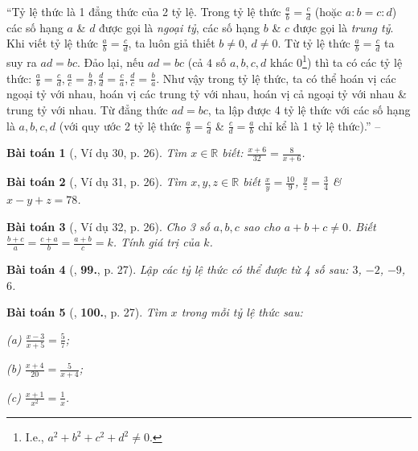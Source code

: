 \documentclass{article}
\numberwithin{equation}{section}
\newtheorem{baitoan}{Bài toán}
\begin{document}
``Tỷ lệ thức là 1 đẳng thức của 2 tỷ lệ. Trong tỷ lệ thức $\frac{a}{b} = \frac{c}{d}$ (hoặc $a:b = c:d$) các số hạng $a$ \& $d$ được gọi là \textit{ngoại tỷ}, các số hạng $b$ \& $c$ được gọi là \textit{trung tỷ}. Khi viết tỷ lệ thức $\frac{a}{b} = \frac{c}{d}$, ta luôn giả thiết $b\ne 0$, $d\ne 0$. Từ tỷ lệ thức $\frac{a}{b} = \frac{c}{d}$ ta suy ra $ad = bc$. Đảo lại, nếu $ad = bc$ (cả $4$ số $a,b,c,d$ khác $0$\footnote{I.e., $a^2 + b^2 + c^2 + d^2\ne 0$.}) thì ta có các tỷ lệ thức: $\frac{a}{b} = \frac{c}{d},\frac{a}{c} = \frac{b}{d},\frac{d}{d} = \frac{c}{a},\frac{d}{c} = \frac{b}{a}$. Như vậy trong tỷ lệ thức, ta có thể hoán vị các ngoại tỷ với nhau, hoán vị các trung tỷ với nhau, hoán vị cả ngoại tỷ với nhau \& trung tỷ với nhau. Từ đẳng thức $ad = bc$, ta lập được 4 tỷ lệ thức với các số hạng là $a,b,c,d$ (với quy ước 2 tỷ lệ thức $\frac{a}{b} = \frac{c}{d}$ \& $\frac{c}{d} = \frac{a}{b}$ chỉ kể là 1 tỷ lệ thức).'' -- \cite[\S4]{Binh_Toan_7_tap_1}

\begin{baitoan}[\cite{Tuyen_Toan_7}, Ví dụ 30, p. 26]
	Tìm $x\in\mathbb{R}$ biết: $\frac{x + 6}{32} = \frac{8}{x + 6}$.
\end{baitoan}

\begin{baitoan}[\cite{Tuyen_Toan_7}, Ví dụ 31, p. 26]
	Tìm $x,y,z\in\mathbb{R}$ biết $\frac{x}{y} = \frac{10}{9}$, $\frac{y}{z} = \frac{3}{4}$ \& $x - y + z = 78$.
\end{baitoan}

\begin{baitoan}[\cite{Tuyen_Toan_7}, Ví dụ 32, p. 26]
	Cho 3 số $a,b,c$ sao cho $a + b + c\ne 0$. Biết $\frac{b + c}{a} = \frac{c + a}{b} = \frac{a + b}{c} = k$. Tính giá trị của $k$.
\end{baitoan}

\begin{baitoan}[\cite{Tuyen_Toan_7}, \textbf{99.}, p. 27]
	Lập các tỷ lệ thức có thể được từ 4 số sau: $3$, $-2$, $-9$, $6$.
\end{baitoan}

\begin{baitoan}[\cite{Tuyen_Toan_7}, \textbf{100.}, p. 27]
	Tìm $x$ trong mỗi tỷ lệ thức sau:
	\begin{enumerate*}
		\item[(a)] $\frac{x - 3}{x + 5} = \frac{5}{7}$;
		\item[(b)] $\frac{x + 4}{20} = \frac{5}{x + 4}$;
		\item[(c)] $\frac{x + 1}{x^2} = \frac{1}{x}$.
	\end{enumerate*}
\end{baitoan}
\end{document}
